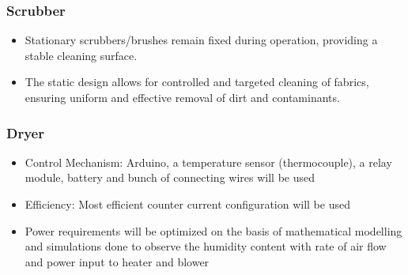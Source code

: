 \documentclass[table,french,english]{rapportCS}
\begin{document}
    \subsubsection*{Scrubber}
        \begin{itemize}[label=$\bullet$]
        \item Stationary scrubbers/brushes remain fixed during operation, providing a stable cleaning surface. 
        \item The static design allows for controlled and targeted cleaning of fabrics, ensuring uniform and effective removal of dirt and contaminants. 
        \end{itemize}
    \subsubsection*{Dryer}
        \begin{itemize}[label=$\bullet$]
        \item Control Mechanism: Arduino, a temperature sensor (thermocouple), a relay module, battery and bunch of connecting wires will be used 
        \item \gls{Efficiency}:   Most efficient counter current configuration will be used 
        \item Power requirements will be optimized on the basis of mathematical modelling and simulations done to observe the humidity content with rate of air flow and power input to heater and blower 
        \end{itemize}
        \clearpage
\end{document}
